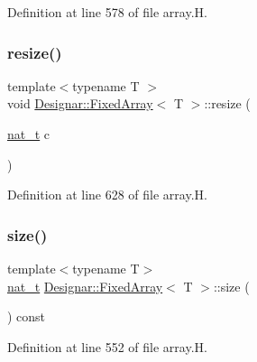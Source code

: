 Definition at line 578 of file array.\+H.

\mbox{\label{class_designar_1_1_fixed_array_af52fca1277e52d28ce6d46ed4a7b471e}} 
\subsubsection{\texorpdfstring{resize()}{resize()}}
{\footnotesize\ttfamily template$<$typename T $>$ \\
void \hyperlink{class_designar_1_1_fixed_array}{Designar\+::\+Fixed\+Array}$<$ T $>$\+::resize (\begin{DoxyParamCaption}\item[{\hyperlink{namespace_designar_aa72662848b9f4815e7bf31a7cf3e33d1}{nat\+\_\+t}}]{c }\end{DoxyParamCaption})}



Definition at line 628 of file array.\+H.

\mbox{\label{class_designar_1_1_fixed_array_a03ce71d0cc8f4155f117bbfe83bb95e8}} 
\subsubsection{\texorpdfstring{size()}{size()}}
{\footnotesize\ttfamily template$<$typename T$>$ \\
\hyperlink{namespace_designar_aa72662848b9f4815e7bf31a7cf3e33d1}{nat\+\_\+t} \hyperlink{class_designar_1_1_fixed_array}{Designar\+::\+Fixed\+Array}$<$ T $>$\+::size (\begin{DoxyParamCaption}{ }\end{DoxyParamCaption}) const\hspace{0.3cm}{\ttfamily [inline]}}



Definition at line 552 of file array.\+H.

\mbox{\label{class_designar_1_1_fixed_array_ab13ae0d1146e753d3e1128e1cce07d91}} 
